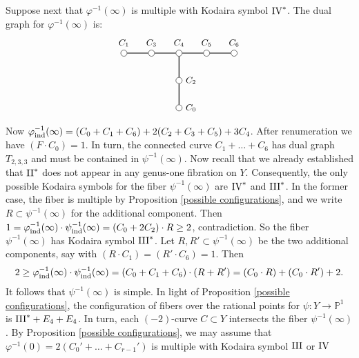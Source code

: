 \documentclass[oneside, 12pt]{amsart}
\theoremstyle{definition}
\theoremstyle{remark}
\newcommand{\PP}{\mathbb{P}}
\newcommand{\II}{\text{\rm II}}
\newcommand{\III}{\text{\rm III}}
\newcommand{\IV}{\text{\rm IV}}
\newcommand{\ra}{\rightarrow}
\newcommand{\ind}{\text{\rm ind}}
\newcommand{\inv}{{-1}}
\begin{document}
Suppose next that $\varphi^{-1}(\infty)$ is multiple with Kodaira symbol $\IV^*$.
The dual graph for $\varphi^{-1}(\infty)$ is:
\begin{equation*}
\begin{gathered}
\begin{tikzpicture}
[node distance=1cm, font=\small]
\tikzstyle{vertex}=[circle, draw, fill=white, inner sep=0mm, minimum size=1.5ex]
\node[vertex]	(C1)  	at (1,0) 	[label=above:{$C_1$}] {};
\node[vertex]	(C3)			[right of=C1,  label=above:{$C_3$}]	{};
\node[vertex]	(C4)			[right of=C3,  label=above:{$C_4$}]	{};
\node[vertex]	(C2)			[below of=C4,  label=right:{$C_2$}]	{};
\node[vertex]	(C5)			[right of=C4,  label=above:{$C_5$}]	{};
\node[vertex]	(C6)			[right of=C5,  label=above:{$C_6$}]	{};
 \node[vertex]	(C0)			[below of=C2,  label=right:{$C_0$}]	{};

\draw[thick]    (C1)--(C3)--(C4)-- (C5)--(C6);
\draw[thick]    (C4)--(C2)--(C0);
\end{tikzpicture}
\end{gathered}
\end{equation*}
Now $\varphi^\inv_\ind(\infty)=(C_0+C_1+C_6)+2(C_2+C_3+C_5)+ 3C_4$.
After renumeration  we have $(F\cdot C_0)=1$. In turn, the connected curve $C_1+\ldots+C_6$ has dual graph $T_{2,3,3}$
and must be contained in $\psi^{-1}(\infty)$. 
Now recall that we already established that $\II^*$ does not appear in any genus-one fibration on $Y$.
Consequently, the only possible Kodaira symbols for
the fiber $\psi^{-1}(\infty)$ are $\IV^*$ and $\III^*$. 
In the former case, the fiber is multiple  by Proposition \ref{possible configurations},
and we write  $R\subset\psi^{-1}(\infty)$ for the additional component. 
Then $1=\varphi^{-1}_\ind(\infty)\cdot\psi^{-1}_\ind(\infty) = (C_0+2C_2)\cdot R\geq 2$, contradiction.
So the fiber $\psi^{-1}(\infty)$ has Kodaira symbol $\III^*$.
Let $R,R'\subset\psi^{-1}(\infty)$ be the two additional components, say with
$(R\cdot C_1)=(R'\cdot C_6)=1$. Then
$$
2\geq \varphi^{-1}_\ind(\infty)\cdot\psi^{-1}_\ind(\infty)  = (C_0+C_1+C_6)\cdot (R+R')= (C_0\cdot R) + (C_0\cdot R')+2.
$$
It follows that $\psi^{-1}(\infty)$ is simple. In light of Proposition \ref{possible configurations}, 
the configuration of fibers over the rational points  for $\psi:Y\ra\PP^1$
is $\III^*+E_4+E_4$. In turn, each $(-2)$-curve $C\subset Y$ intersects the fiber $\psi^{-1}(\infty)$.
By Proposition \ref{possible configurations}, 
we may assume that $\varphi^{-1}(0)=2(C_0'+\ldots+C_{r-1}')$ is multiple with  Kodaira symbol $\III$ or $\IV$
\end{document}
